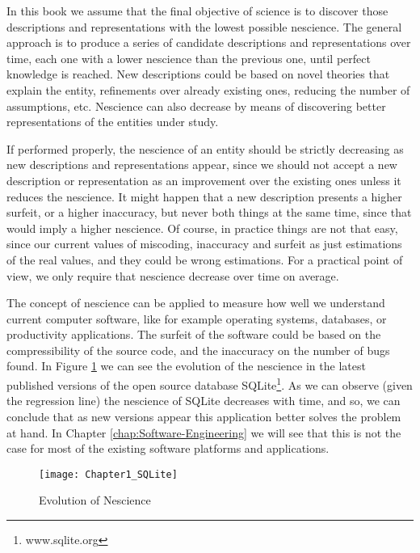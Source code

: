 In this book we assume that the final objective of science is to discover those descriptions and representations with the lowest possible nescience. The general approach is to produce a series of candidate descriptions and representations over time, each one with a lower nescience than the previous one, until perfect knowledge is reached. New descriptions could be based on novel theories that explain the entity, refinements over already existing ones, reducing the number of assumptions, etc. Nescience can also decrease by means of discovering better representations of the entities under study.

If performed properly, the nescience of an entity should be strictly decreasing as new descriptions and representations appear, since we should not accept a new description or representation as an improvement over the existing ones unless it reduces the nescience. It might happen that a new description presents a higher surfeit, or a higher inaccuracy, but never both things at the same time, since that would imply a higher nescience. Of course, in practice things are not that easy, since our current values of miscoding, inaccuracy and surfeit as just estimations of the real values, and they could be wrong estimations. For a practical point of view, we only require that nescience decrease over time on average.

\begin{example}
The concept of nescience can be applied to measure how well we understand current computer software, like for example operating systems, databases, or productivity applications. The surfeit of the software could be based on the compressibility of the source code, and the inaccuracy on the number of bugs found. In Figure \ref{fig:Chapter1_SQLite} we can see the evolution of the nescience in the latest published versions of the open source database SQLite\footnote{www.sqlite.org}. As we can observe (given the regression line) the nescience of SQLite decreases with time, and so, we can conclude that as new versions appear this application better solves the problem at hand. In Chapter \ref{chap:Software-Engineering} we will see that this is not the case for most of the existing software platforms and applications.
\end{example}

\begin{figure}[h]
\centering\texttt{[image: Chapter1\_SQLite]}
\caption{\label{fig:Chapter1_SQLite}Evolution of Nescience}
\end{figure}

